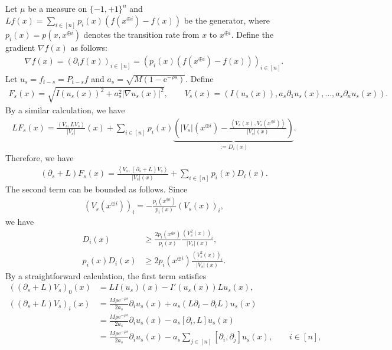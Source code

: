 \documentclass[11pt]{article}
\theoremstyle{plain}
\theoremstyle{definition}
\theoremstyle{remark}
\newcommand{\e}{\mathrm{e}}
\newcommand{\tuple}[1]{\left(#1\right)}
\newcommand{\inner}[2]{\left\langle #1,#2\right\rangle}
\newcommand{\tp}{\tuple}
\newcommand{\abs}[1]{\left\vert#1\right\vert}
\begin{document}
Let $\mu$ be a measure on $\{-1,+1\}^n$ and $Lf (x) = \sum_{i \in [n]} p_i(x) \tp{f(x^{\oplus i}) - f(x)}$ be the generator, where $p_i(x) = p(x,x^{\oplus i})$ denotes the transition rate from $x$ to $x^{\oplus i}$.
Define the gradient $\nabla f(x)$ as follows:
\begin{align*}
    \nabla f(x) = \tp{\partial_i f(x)}_{i \in [n]} = \tp{p_i(x) (f(x^{\oplus i}) - f(x))}_{i \in [n]}.
\end{align*}
Let $u_s=f_{t-s}=P_{t-s}f$ and $a_s=\sqrt{M(1-\e^{-\rho s})}$. Define
\begin{align*}
    F_s(x) = \sqrt{I(u_s(x))^2+a_s^2\abs{\nabla u_s(x)}^2},
    \qquad
    V_s(x) = \tp{I(u_s(x)), a_s\partial_1u_s(x), \ldots, a_s\partial_nu_s(x)}.
\end{align*}
By a similar calculation, we have
\begin{align*}
    L F_s(x) = \frac{\inner{V_s}{L V_s}}{\abs{V_s}}(x) + \sum_{i \in [n]} p_i(x) \underbrace{\tp{\abs{V_s}(x^{\oplus i}) - \frac{\inner{V_s(x)}{V_s(x^{\oplus i})}}{\abs{V_s}(x)}}}_{:=D_i(x)}.
\end{align*}
Therefore, we have
\begin{align*}
    (\partial_s + L) F_s(x) = \frac{\inner{V_s}{(\partial_s + L) V_s}}{\abs{V_s}(x)} + \sum_{i \in [n]} p_i(x) D_i(x).
\end{align*}
The second term can be bounded as follows. Since
\begin{align*}
    (V_s(x^{\oplus i}))_i
    = -\frac{p_i(x^{\oplus i})}{p_i(x)}(V_s(x))_i,
\end{align*}
we have
\begin{align*}
    D_i(x)
    &\ge \frac{2 p_i(x^{\oplus i})}{p_i(x)} \frac{(V_{s}^2(x))_i}{\abs{V_s}(x)},\\
    p_i(x)D_i(x)
    &\ge 2 p_i(x^{\oplus i}) \frac{(V_{s}^2(x))_i}{\abs{V_s}(x)}.
\end{align*}
By a straightforward calculation, the first term satisfies
\begin{align*}
    ((\partial_s + L) V_s)_0(x)
    &= L I(u_s)(x)-I'(u_s(x))Lu_s(x),\\
    ((\partial_s + L) V_s)_i(x)
    &= \frac{M\rho\e^{-\rho s}}{2a_s}\partial_i u_s(x)
    +a_s\tp{L\partial_i-\partial_i L}u_s(x)\\
    &= \frac{M\rho\e^{-\rho s}}{2a_s}\partial_i u_s(x)
    -a_s[\partial_i,L]u_s(x)\\
    &= \frac{M\rho\e^{-\rho s}}{2a_s}\partial_i u_s(x)
    -a_s\sum_{j \in [n]}[\partial_i,\partial_j]u_s(x),
    \qquad i \in [n],
\end{align*}
\end{document}
